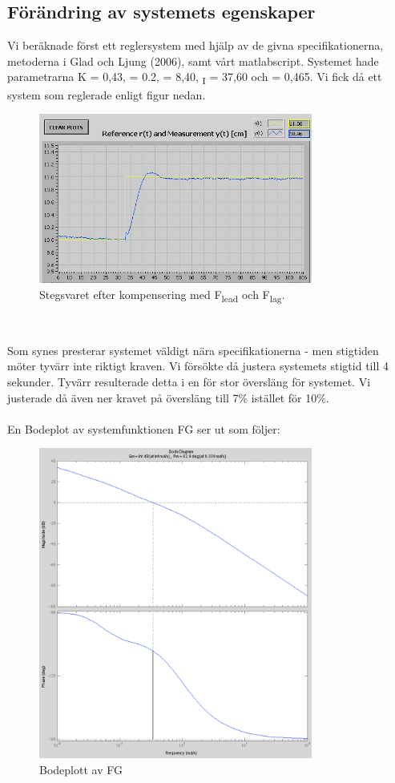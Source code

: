 \documentclass[a4wide]{article}
\begin{document}
\subsection{Förändring av systemets egenskaper}

Vi beräknade först ett reglersystem med hjälp av de givna specifikationerna, metoderna i Glad och Ljung (2006), samt vårt matlabscript. Systemet hade parametrarna K = 0,43, \textbeta = 0.2,  = 8,40, {\textsubscript{I}} = 37,60 och \textgamma = 0,465. Vi fick då ett system som reglerade enligt figur nedan. 

\begin{figure}[ht!]
\centering
\includegraphics[width=90mm]{Test1_cut.jpg}
\caption{Stegsvaret efter kompensering med F\textsubscript{lead} och F\textsubscript{lag}.}
\label{overflow}
\end{figure}
~\\

\newpage

Som synes presterar systemet väldigt nära specifikationerna - men stigtiden möter tyvärr inte riktigt kraven. Vi försökte då justera systemets stigtid till 4 sekunder. Tyvärr resulterade detta i en för stor översläng för systemet. Vi justerade då även ner kravet på översläng till 7\% istället för 10\%.  \\
~\\
En Bodeplot av systemfunktionen FG ser ut som följer: 

\begin{figure}[ht!]
\centering
\includegraphics[width=90mm]{bode_Gny_cut.png}
\caption{Bodeplott av FG}
\label{overflow}
\end{figure}
~\\
\end{document}
